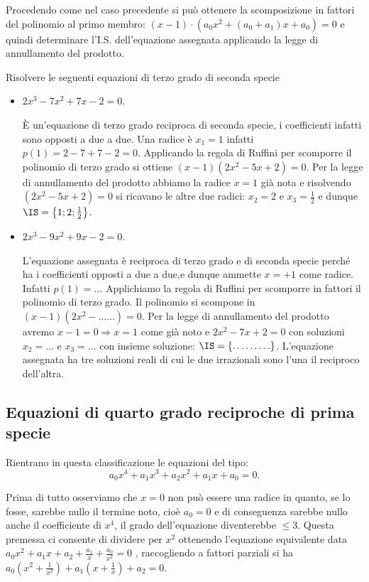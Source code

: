 Procedendo come nel caso precedente si può ottenere la scomposizione in fattori del polinomio al primo membro: $(x-1)\cdot \left(a_0x^2+(a_0+a_1)x+a_0\right)=0$ e quindi determinare l’I.S. dell’equazione assegnata applicando la legge di annullamento del prodotto.
\begin{exrig}
 \begin{esempio}
 Risolvere le seguenti equazioni di terzo grado di seconda specie

 \begin{itemize}
 \item $ 2x^3-7x^2+7x-2=0 $.

 È un’equazione di terzo grado reciproca di seconda specie, i coefficienti infatti sono opposti a due a due. Una radice è $x_1=1$ infatti $p(1)=2-7+7-2=0$. Applicando la regola di Ruffini per scomporre il polinomio di terzo grado si ottiene $(x-1)\left(2x^2-5x+2\right)=0$. Per la legge di annullamento del prodotto abbiamo la radice $x=1$ già nota e risolvendo $\left(2x^2-5x+2\right)=0$ si ricavano le altre due radici: $x_2=2$ e $x_3=\frac 1 2$ e dunque $\IS=\left\{1;2;\frac 1 2\right\}$.

 \item $ 2x^3-9x^2+9x-2=0 $.

 L’equazione assegnata è reciproca di terzo grado e di seconda specie perché ha i coefficienti opposti a due a due,e dunque ammette $x=+1$ come radice. Infatti $p(1)=\ldots$
 Applichiamo la regola di Ruffini per scomporre in fattori il polinomio di terzo grado. Il polinomio si scompone in $(x-1)\left(2x^2- \ldots \ldots\right)=0$. Per la legge di annullamento del prodotto avremo $x-1=0\Rightarrow x=1$ come già noto e $2x^2-7x+2=0$ con soluzioni $x_2=\ldots $ e $x_3=\ldots $ con insieme soluzione: $\IS=\{\ldots \ldots \ldots \}$. L’equazione assegnata ha tre soluzioni reali di cui le due irrazionali sono l’una il reciproco dell’altra.
 \end{itemize}
 \end{esempio}
\end{exrig}
\ovalbox{\risolvii \ref{ese:5.42},\ref{ese:5.43},\ref{ese:5.44}}

\subsection{Equazioni di quarto grado reciproche di prima specie}
Rientrano in questa classificazione le equazioni del tipo: \[a_0x^4+a_1x^3+a_2x^2+a_1x+a_0=0.\]

Prima di tutto osserviamo che $x=0$ non può essere una radice in quanto, se lo fosse, sarebbe nullo il termine noto, cioè $a_0=0$ e di conseguenza sarebbe nullo anche il coefficiente di $ x^{4} $, il grado dell’equazione diventerebbe $\le 3$. Questa premessa ci consente di dividere per $x^2$ ottenendo l’equazione equivalente data $a_0 x^2+a_1x+a_2+\frac{a_1} x+\frac{a_0}{x^2}=0$ , raccogliendo a fattori parziali si ha $a_0\left(x^2+\frac 1{x^2}\right)+a_1\left(x+\frac 1 x\right)+a_2=0$.

